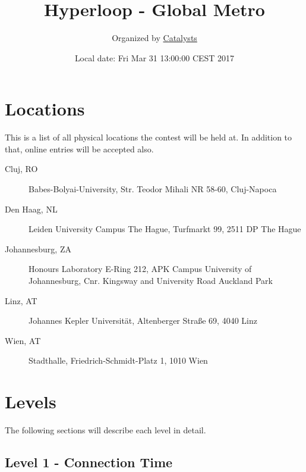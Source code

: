 \documentclass[a4paper,11pt]{article}
\begin{document}
\title{Hyperloop - Global Metro}
\author{Organized by \href{https://contest.catalysts.cc/}{Catalysts}}
\date{Local date: Fri Mar 31 13:00:00 CEST 2017}
\maketitle
\vspace{1em}


\section{Locations}

This is a list of all physical locations the contest will be held at. In addition to that, online entries will be
accepted also.

\begin{description}
  \item[Cluj, RO] Babes-Bolyai-University, Str. Teodor Mihali NR 58-60, Cluj-Napoca
  \item[Den Haag, NL] Leiden University Campus The Hague, Turfmarkt 99, 2511 DP The Hague
  \item[Johannesburg, ZA] Honours Laboratory E-Ring 212, APK Campus University of Johannesburg, Cnr. Kingsway and University Road Auckland Park
  \item[Linz, AT] Johannes Kepler Universität, Altenberger Straße 69, 4040 Linz
  \item[Wien, AT] Stadthalle, Friedrich-Schmidt-Platz 1, 1010 Wien
\end{description}


\section{Levels}

The following sections will describe each level in detail.

\subsection{Level 1 - Connection Time}
\end{document}
